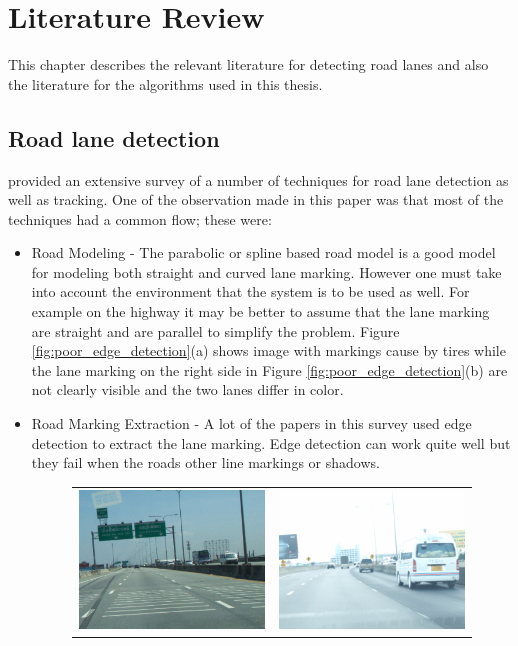 \setlength{\footskip}{8mm}
\chapter{ Literature Review } \label{sec:literature}
This chapter describes the relevant literature for detecting road lanes and also the literature for the algorithms used in this thesis. 

\section{Road lane detection} 
 provided an extensive survey of a number of
techniques for road lane detection as well as tracking. One of the observation 
made in this paper was that most of the techniques had a common flow; these 
were:
\begin{itemize}
\item Road Modeling - The parabolic or spline based road model is a good model 
for modeling both straight and curved lane marking. However one must take into 
account the environment that the system is to be used as well. For example on 
the highway it may be better to assume that the lane marking are straight and 
are parallel to simplify the problem. Figure \ref{fig:poor_edge_detection}(a) shows image with markings cause by tires while the lane marking on the right side in Figure \ref{fig:poor_edge_detection}(b) are not clearly visible and the two lanes differ in color. 
\item Road Marking Extraction - A lot of the papers in this survey used edge 
detection to extract the lane marking. Edge detection can work quite well but 
they fail when the roads other line markings or shadows. 
\begin{figure}
  \centering
  \begin{tabular}{c c}
    \includegraphics[width=60mm]{figures/edge1.jpg} &
    \includegraphics[width=60mm]{figures/edge2.jpg} \\

\end{tabular}
\end{figure}
\end{itemize}
